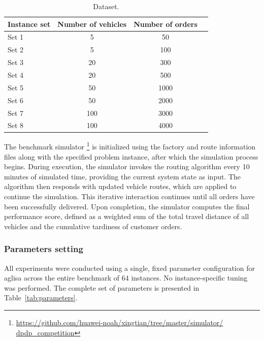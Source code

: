 \documentclass[]{interact}
\begin{document}
\begin{table}
\centering
\caption{Dataset.}\label{tab:dataset_settings}
\begin{tabular}{lccc}
\hline
\textbf{Instance set}  & \textbf{Number of vehicles} & \textbf{Number of orders} \\ 
\hline
Set 1 & 5 & 50 \\
Set 2  & 5 & 100 \\
Set 3 & 20 & 300 \\
Set 4  & 20 & 500 \\
Set 5  & 50 & 1000 \\
Set 6  & 50 & 2000 \\
Set 7  & 100 & 3000 \\
Set 8  & 100 & 4000 \\
\hline
\end{tabular}%
\end{table}



The benchmark simulator \footnote{\hyperlink{https://github.com/huawei-noah/xingtian/tree/master/simulator/
dpdp_competition}{https://github.com/huawei-noah/xingtian/tree/master/simulator/
dpdp\_competition}} is initialized using the factory and route information files along with the specified problem instance, after which the simulation process begins. During execution, the simulator invokes the routing algorithm every 10 minutes of simulated time, providing the current system state as input. The algorithm then responds with updated vehicle routes, which are applied to continue the simulation. This iterative interaction continues until all orders have been successfully delivered. Upon completion, the simulator computes the final performance score, defined as a weighted sum of the total travel distance of all vehicles and the cumulative tardiness of customer orders. 

\subsubsection{Parameters setting} \label{ss:exp-params}

All experiments were conducted using a single, fixed parameter configuration for \gls{aglisa} across the entire benchmark of 64 instances. No instance-specific tuning was performed. The complete set of parameters is presented in Table~\ref{tab:parameters}.
\end{document}
